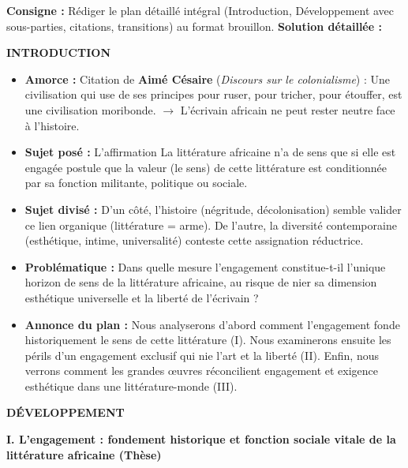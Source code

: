 \documentclass[11pt]{article}
\begin{document}
\begin{exoresolu}
\textbf{Consigne :} Rédiger le plan détaillé intégral (Introduction, Développement avec sous-parties, citations, transitions) au format brouillon.
\tcblower
\textbf{Solution détaillée :}

\textbf{INTRODUCTION}
\begin{itemize}
    \item \textbf{Amorce :} Citation de \textbf{Aimé Césaire} (\emph{Discours sur le colonialisme}) : \og Une civilisation qui use de ses principes pour ruser, pour tricher, pour étouffer, est une civilisation moribonde. \fg $\rightarrow$ L'écrivain africain ne peut rester neutre face à l'histoire.
    \item \textbf{Sujet posé :} L'affirmation \og La littérature africaine n'a de sens que si elle est engagée \fg postule que la valeur (le sens) de cette littérature est conditionnée par sa fonction militante, politique ou sociale.
    \item \textbf{Sujet divisé :} D'un côté, l'histoire (négritude, décolonisation) semble valider ce lien organique (littérature = arme). De l'autre, la diversité contemporaine (esthétique, intime, universalité) conteste cette assignation réductrice.
    \item \textbf{Problématique :} \og Dans quelle mesure l'engagement constitue-t-il l'unique horizon de sens de la littérature africaine, au risque de nier sa dimension esthétique universelle et la liberté de l'écrivain ? \fg
    \item \textbf{Annonce du plan :} Nous analyserons d'abord comment l'engagement fonde historiquement le sens de cette littérature (I). Nous examinerons ensuite les périls d'un engagement exclusif qui nie l'art et la liberté (II). Enfin, nous verrons comment les grandes œuvres réconcilient engagement et exigence esthétique dans une \og littérature-monde \fg (III).
\end{itemize}

\textbf{DÉVELOPPEMENT}

\textbf{I. L'engagement : fondement historique et fonction sociale vitale de la littérature africaine (Thèse)}


\end{exoresolu}
\end{document}
